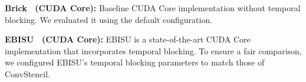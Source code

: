 \noindent\textbf{Brick~\cite{zhao2019exploiting} (CUDA Core):} Baseline CUDA Core implementation without temporal blocking. We evaluated it using the default configuration.

\noindent\textbf{EBISU~\cite{10.1145/3577193.3593716} (CUDA Core):} EBISU is a state-of-the-art CUDA Core implementation that incorporates temporal blocking. To ensure a fair comparison, we configured EBISU's temporal blocking parameters to match those of ConvStencil.



